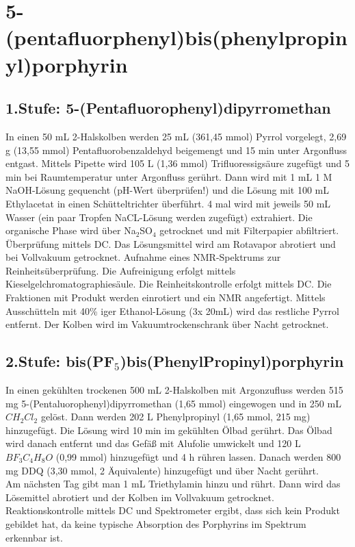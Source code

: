 \section{5-(pentafluorphenyl)bis(phenylpropinyl)porphyrin}
\subsection{1.Stufe: 5-(Pentafluorophenyl)dipyrromethan}
In einen 50 mL 2-Halskolben werden 25 mL (361,45 mmol) Pyrrol vorgelegt, 2,69 g (13,55 mmol) Pentafluorobenzaldehyd beigemengt und 15 min unter Argonfluss entgast. Mittels Pipette wird 105 \textmu L (1,36 mmol) Trifluoressigsäure zugefügt und 5 min bei Raumtemperatur unter Argonfluss gerührt. Dann wird mit 1 mL 1 M NaOH-Lösung gequencht (pH-Wert überprüfen!) und die Lösung mit 100 mL Ethylacetat in einen Schütteltrichter überführt. 4 mal wird mit jeweils 50 mL Wasser (ein paar Tropfen NaCL-Lösung werden zugefügt) extrahiert. Die organische Phase wird über Na$_2$SO$_4$ getrocknet und mit Filterpapier abfiltriert. Überprüfung mittels DC. Das Lösungsmittel wird am Rotavapor abrotiert und bei Vollvakuum getrocknet. Aufnahme eines NMR-Spektrums zur Reinheitsüberprüfung. Die Aufreinigung erfolgt mittels Kieselgelchromatographiesäule. Die Reinheitskontrolle erfolgt mittels DC. Die Fraktionen mit Produkt werden einrotiert und ein NMR angefertigt. Mittels Ausschütteln mit 40\% iger Ethanol-Lösung (3x 20mL) wird das restliche Pyrrol entfernt. Der Kolben wird im Vakuumtrockenschrank über Nacht getrocknet.


\subsection{2.Stufe: bis(PF$_5$)bis(PhenylPropinyl)porphyrin}

In einen gekühlten trockenen 500 mL 2-Halskolben mit Argonzufluss werden 515 mg 5-(Pentaluorophenyl)dipyrromethan (1,65 mmol) eingewogen und in 250 mL $CH_2Cl_2$ gelöst. Dann werden 202 \textmu L Phenylpropinyl (1,65 mmol, 215 mg) hinzugefügt. Die Lösung wird 10 min im gekühlten Ölbad gerührt. Das Ölbad wird danach entfernt und das Gefäß mit Alufolie umwickelt und 120 \textmu L $BF_3C_4H_8O$ (0,99 mmol) hinzugefügt und 4 h rühren lassen. Danach werden 800 mg DDQ (3,30 mmol, 2 Äquivalente) hinzugefügt und über Nacht gerührt.
\\ Am nächsten Tag gibt man 1 mL Triethylamin hinzu und rührt. Dann wird das Lösemittel abrotiert und der Kolben im Vollvakuum getrocknet. Reaktionskontrolle mittels DC und Spektrometer ergibt, dass sich kein Produkt gebildet hat, da keine typische Absorption des Porphyrins im Spektrum erkennbar ist.

